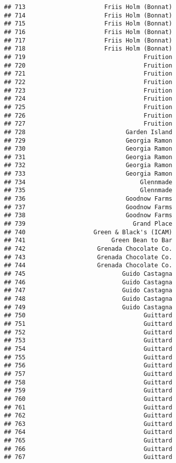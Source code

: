 \documentclass[
]{article}
\begin{document}
\begin{verbatim}
## 713                      Friis Holm (Bonnat)
## 714                      Friis Holm (Bonnat)
## 715                      Friis Holm (Bonnat)
## 716                      Friis Holm (Bonnat)
## 717                      Friis Holm (Bonnat)
## 718                      Friis Holm (Bonnat)
## 719                                 Fruition
## 720                                 Fruition
## 721                                 Fruition
## 722                                 Fruition
## 723                                 Fruition
## 724                                 Fruition
## 725                                 Fruition
## 726                                 Fruition
## 727                                 Fruition
## 728                            Garden Island
## 729                            Georgia Ramon
## 730                            Georgia Ramon
## 731                            Georgia Ramon
## 732                            Georgia Ramon
## 733                            Georgia Ramon
## 734                                Glennmade
## 735                                Glennmade
## 736                            Goodnow Farms
## 737                            Goodnow Farms
## 738                            Goodnow Farms
## 739                              Grand Place
## 740                   Green & Black's (ICAM)
## 741                        Green Bean to Bar
## 742                    Grenada Chocolate Co.
## 743                    Grenada Chocolate Co.
## 744                    Grenada Chocolate Co.
## 745                           Guido Castagna
## 746                           Guido Castagna
## 747                           Guido Castagna
## 748                           Guido Castagna
## 749                           Guido Castagna
## 750                                 Guittard
## 751                                 Guittard
## 752                                 Guittard
## 753                                 Guittard
## 754                                 Guittard
## 755                                 Guittard
## 756                                 Guittard
## 757                                 Guittard
## 758                                 Guittard
## 759                                 Guittard
## 760                                 Guittard
## 761                                 Guittard
## 762                                 Guittard
## 763                                 Guittard
## 764                                 Guittard
## 765                                 Guittard
## 766                                 Guittard
## 767                                 Guittard

\end{verbatim}
\end{document}
